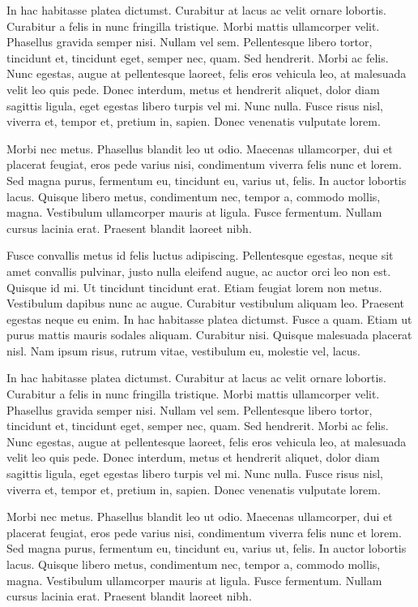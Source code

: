 \begin{multicols}{2}
In hac habitasse platea dictumst. Curabitur at lacus ac velit ornare
lobortis. Curabitur a felis in nunc fringilla tristique. Morbi mattis
ullamcorper velit. Phasellus gravida semper nisi. Nullam vel sem.
Pellentesque libero tortor, tincidunt et, tincidunt eget, semper nec,
quam. Sed hendrerit. Morbi ac felis. Nunc egestas, augue at
pellentesque laoreet, felis eros vehicula leo, at malesuada velit leo
quis pede. Donec interdum, metus et hendrerit aliquet, dolor diam
sagittis ligula, eget egestas libero turpis vel mi. Nunc nulla. Fusce
risus nisl, viverra et, tempor et, pretium in, sapien. Donec venenatis
vulputate lorem.

Morbi nec metus. Phasellus blandit leo ut odio. Maecenas ullamcorper,
dui et placerat feugiat, eros pede varius nisi, condimentum viverra
felis nunc et lorem. Sed magna purus, fermentum eu, tincidunt eu,
varius ut, felis. In auctor lobortis lacus. Quisque libero metus,
condimentum nec, tempor a, commodo mollis, magna. Vestibulum
ullamcorper mauris at ligula. Fusce fermentum. Nullam cursus lacinia
erat. Praesent blandit laoreet nibh.

Fusce convallis metus id felis luctus adipiscing. Pellentesque
egestas, neque sit amet convallis pulvinar, justo nulla eleifend
augue, ac auctor orci leo non est. Quisque id mi. Ut tincidunt
tincidunt erat. Etiam feugiat lorem non metus. Vestibulum dapibus nunc
ac augue. Curabitur vestibulum aliquam leo. Praesent egestas neque eu
enim. In hac habitasse platea dictumst. Fusce a quam. Etiam ut purus
mattis mauris sodales aliquam. Curabitur nisi. Quisque malesuada
placerat nisl. Nam ipsum risus, rutrum vitae, vestibulum eu, molestie
vel, lacus.

In hac habitasse platea dictumst. Curabitur at lacus ac velit ornare
lobortis. Curabitur a felis in nunc fringilla tristique. Morbi mattis
ullamcorper velit. Phasellus gravida semper nisi. Nullam vel sem.
Pellentesque libero tortor, tincidunt et, tincidunt eget, semper nec,
quam. Sed hendrerit. Morbi ac felis. Nunc egestas, augue at
pellentesque laoreet, felis eros vehicula leo, at malesuada velit leo
quis pede. Donec interdum, metus et hendrerit aliquet, dolor diam
sagittis ligula, eget egestas libero turpis vel mi. Nunc nulla. Fusce
risus nisl, viverra et, tempor et, pretium in, sapien. Donec venenatis
vulputate lorem.

Morbi nec metus. Phasellus blandit leo ut odio. Maecenas ullamcorper,
dui et placerat feugiat, eros pede varius nisi, condimentum viverra
felis nunc et lorem. Sed magna purus, fermentum eu, tincidunt eu,
varius ut, felis. In auctor lobortis lacus. Quisque libero metus,
condimentum nec, tempor a, commodo mollis, magna. Vestibulum
ullamcorper mauris at ligula. Fusce fermentum. Nullam cursus lacinia
erat. Praesent blandit laoreet nibh.


\end{multicols}
